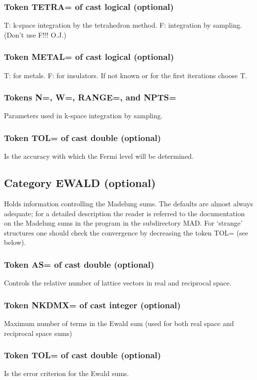 \documentclass[aps,twocolumn,a4]{revtex4}
\begin{document}
\subsubsection{Token TETRA= of cast logical (optional)}
T: k-space integration by the tetrahedron method. F:
integration by sampling.  (Don't use F!!!  O.J.)

\subsubsection{Token METAL= of cast logical (optional)}
T: for metals. F: for insulators.  If not known or for the
first iterations choose T.

\subsubsection{Tokens N=, W=, RANGE=, and NPTS=}
Parameters used in k-space
integration by sampling.

\subsubsection{Token TOL= of cast double (optional)}
Is the accuracy with which the Fermi level will be determined.

\subsection{Category EWALD (optional)}
Holds information controlling the Madelung sums.  The
defaults are almost always adequate; for a detailed description the
reader is referred to the documentation on the Madelung sums in the
program in the subdirectory MAD.
For `strange' structures one should check the convergence by
decreasing the token TOL= (see below).

\subsubsection{Token AS= of cast double (optional)}
Controls the relative number of lattice vectors in real and
reciprocal space.

\subsubsection{Token NKDMX= of cast integer (optional)}
Maximum number of terms in the Ewald sum (used for both
real space and reciprocal space sums)

\subsubsection{Token TOL= of cast double (optional)}
Is the error criterion for the Ewald sums.
\end{document}
